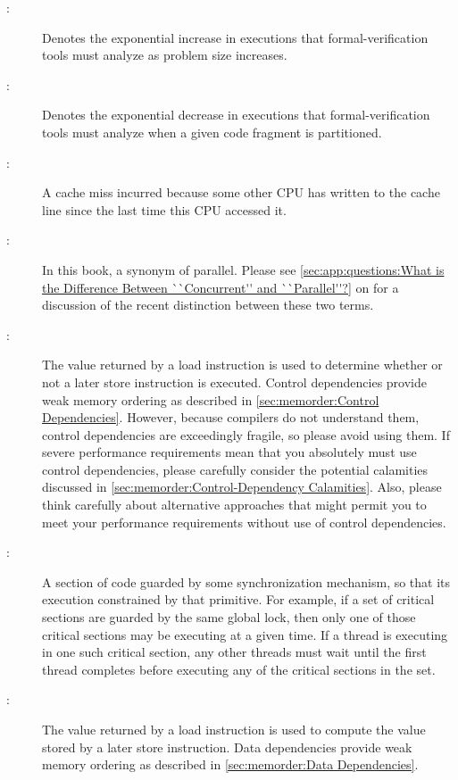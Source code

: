 \begin{description}
\item[:]
	Denotes the exponential increase in executions that
	formal-verification tools must analyze as problem size increases.
\item[:]
	Denotes the exponential decrease in executions that
	formal-verification tools must analyze when a given
	code fragment is partitioned.
\item[:]
	A cache miss incurred because some other CPU has written to
	the cache line since the last time this CPU accessed it.
\item[:]
	In this book, a synonym of parallel.
	Please see \cref{sec:app:questions:What is the Difference Between ``Concurrent'' and ``Parallel''?}
	on 
	for a discussion of the recent distinction between these two
	terms.
\item[:]
	The value returned by a load instruction is used to determine
	whether or not a later store instruction is executed.
	Control dependencies provide weak memory ordering as described
	in \cref{sec:memorder:Control Dependencies}.
	However, because compilers do not understand them, control
	dependencies are exceedingly fragile, so please avoid using them.
	If severe performance requirements mean that you absolutely must
	use control dependencies, please carefully consider the potential
	calamities discussed in
	\cref{sec:memorder:Control-Dependency Calamities}.
	Also, please think carefully about alternative approaches that
	might permit you to meet your performance requirements without
	use of control dependencies.
\item[:]
	A section of code guarded by some synchronization mechanism,
	so that its execution constrained by that primitive.
	For example, if a set of critical sections are guarded by
	the same global lock, then only one of those critical sections
	may be executing at a given time.
	If a thread is executing in one such critical section,
	any other threads must wait until the first thread completes
	before executing any of the critical sections in the set.
\item[:]
	The value returned by a load instruction is used to compute
	the value stored by a later store instruction.
	Data dependencies provide weak memory ordering as described
	in \cref{sec:memorder:Data Dependencies}.

\end{description}
